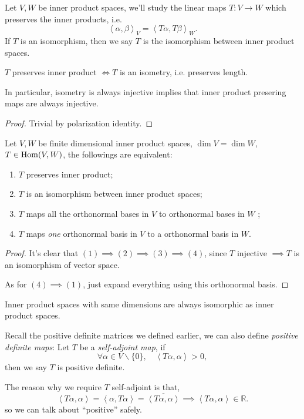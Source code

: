 Let $V, W$ be inner product spaces, we'll study the linear maps $T: V\to W$
which preserves the inner products, i.e.
\[
	\left<\alpha,\beta \right>_V = \left<T\alpha, T\beta \right>_W.
\]
If $T$ is an isomorphism, then we say $T$ is the isomorphism between
inner product spaces.
\begin{proposition}
	$T$ preserves inner product $\iff T$ is an isometry, i.e. preserves length.

	In particular, isometry is always injective implies that
	inner product presering maps are always injective.
\end{proposition}
\begin{proof}[Proof]
    Trivial by polarization identity.
\end{proof}
\begin{proposition}
	Let $V,W$ be finite dimensional inner product spaces, $\dim V = \dim W$,
	$T \in \operatorname{Hom}(V, W)$, the followings are equivalent:
	\begin{enumerate}[\indent(1)]
		\item $T$ preserves inner product;
		\item  $T$ is an isomorphism between inner product spaces;
		\item $T$ maps all the orthonormal bases in $V$ to
			orthonormal bases in $W$ ;
		\item $T$ maps \textit{one} orthonormal basis in $V$ to a
			orthonormal basis in $W$.
	\end{enumerate}
\end{proposition}
\begin{proof}[Proof]
    It's clear that $(1)\implies (2)\implies (3)\implies (4)$,
	since $T$ injective $ \implies T$ is an isomorphism of vector space.

	As for $(4)\implies (1)$, just expand everything using this orthonormal basis.
\end{proof}
\begin{corollary}
    Inner product spaces with same dimensions are always isomorphic
	as inner product spaces.
\end{corollary}

Recall the positive definite matrices we defined earlier,
we can also define \textit{positive definite maps}:
Let $T$ be a \textit{self-adjoint map}, if
\[
	\forall \alpha\in V \backslash \{0\},\quad \left<T\alpha, \alpha \right> > 0,
\]
then we say $T$ is positive definite.

The reason why we require $T$ self-adjoint is that,
\[
\left<T\alpha, \alpha \right> = \left<\alpha, T\alpha \right>
= \overline{\left<T\alpha, \alpha \right>}\implies \left<T\alpha, \alpha \right>\in
\mathbb{R}.
\]
so we can talk about ``positive'' safely.

